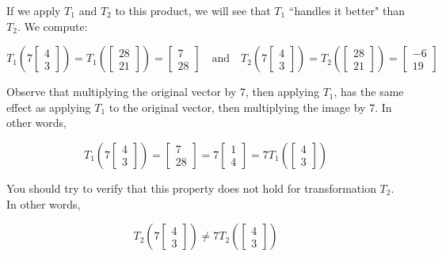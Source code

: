 \documentclass{ximera}
\begin{document}
\begin{exploration}
If we apply $T_1$ and $T_2$ to this product, we will see that $T_1$ ``handles it better" than $T_2$.  We compute:

$$
T_1\left(7\begin{bmatrix}
4\\
3
\end{bmatrix}\right)=T_1\left(\begin{bmatrix}
28\\
21
\end{bmatrix}\right)=\begin{bmatrix}
7\\
28
\end{bmatrix} \quad \text{and} \quad
T_2\left(7\begin{bmatrix}
4\\
3
\end{bmatrix}\right)=T_2\left(\begin{bmatrix}
28\\
21
\end{bmatrix}\right)=\begin{bmatrix}
-6\\
19\end{bmatrix}$$

Observe that multiplying the original vector by $7$, then applying $T_1$, has the same effect as applying $T_1$ to the original vector, then multiplying the image by $7$.  In other words,

$$
T_1\left(7\begin{bmatrix}
4\\
3
\end{bmatrix}\right)=\begin{bmatrix}
7\\
28
\end{bmatrix}=7\begin{bmatrix}
1\\
4
\end{bmatrix}=7T_1\left(\begin{bmatrix}
4\\
3
\end{bmatrix}\right)$$

You should try to verify that this property does not hold for transformation $T_2$.  In other words,

$$
T_2\left(7\begin{bmatrix}
4\\
3
\end{bmatrix}\right)\neq 7T_2\left(\begin{bmatrix}
4\\
3
\end{bmatrix}\right)$$


\end{exploration}
\end{document}
